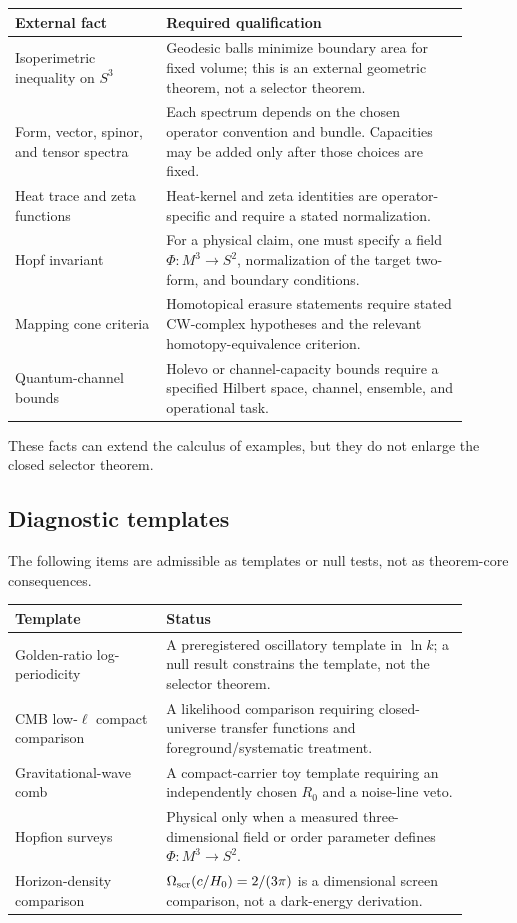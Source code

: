 \documentclass[11pt,a4paper]{article}
\begin{document}
\begin{center}
\small
\begin{tabular}{p{0.30\linewidth}p{0.60\linewidth}}
\toprule
External fact & Required qualification\\
\midrule
Isoperimetric inequality on \(S^3\) & Geodesic balls minimize boundary area for fixed volume; this is an external geometric theorem, not a selector theorem.\\
Form, vector, spinor, and tensor spectra & Each spectrum depends on the chosen operator convention and bundle.  Capacities may be added only after those choices are fixed.\\
Heat trace and zeta functions & Heat-kernel and zeta identities are operator-specific and require a stated normalization.\\
Hopf invariant & For a physical claim, one must specify a field \(\Phi:M^3\to S^2\), normalization of the target two-form, and boundary conditions.\\
Mapping cone criteria & Homotopical erasure statements require stated CW-complex hypotheses and the relevant homotopy-equivalence criterion.\\
Quantum-channel bounds & Holevo or channel-capacity bounds require a specified Hilbert space, channel, ensemble, and operational task.\\
\bottomrule
\end{tabular}
\end{center}

These facts can extend the calculus of examples, but they do not enlarge the closed selector theorem.

\subsection{Diagnostic templates}

The following items are admissible as templates or null tests, not as theorem-core consequences.

\begin{center}
\small
\begin{tabular}{p{0.30\linewidth}p{0.60\linewidth}}
\toprule
Template & Status\\
\midrule
Golden-ratio log-periodicity & A preregistered oscillatory template in \(\ln k\); a null result constrains the template, not the selector theorem.\\
CMB low-\(\ell\) compact comparison & A likelihood comparison requiring closed-universe transfer functions and foreground/systematic treatment.\\
Gravitational-wave comb & A compact-carrier toy template requiring an independently chosen \(R_0\) and a noise-line veto.\\
Hopfion surveys & Physical only when a measured three-dimensional field or order parameter defines \(\Phi:M^3\to S^2\).\\
Horizon-density comparison & \(\Omega_{\rm scr}(c/H_0)=2/(3\pi)\) is a dimensional screen comparison, not a dark-energy derivation.\\
\bottomrule
\end{tabular}
\end{center}
\end{document}

